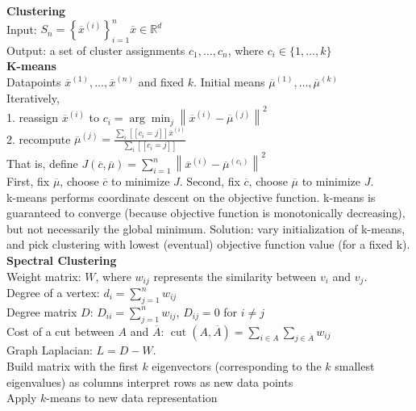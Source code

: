 \documentclass[10pt, letterpaper]{article}
\begin{document}
\begin{multicols*}{2}
\noindent
\textbf{Clustering}\\
Input: $S_{n}=\left\{\overline{x}^{(i)}\right\}_{i=1}^{n} \overline{x} \in \mathbb{R}^{d}$\\
Output: a set of cluster assignments $c_1,\dots,c_n$, where $c_{i} \in\{1, \ldots, k\}$\\
\textbf{K-means}\\
Datapoints $\overline{x}^{(1)}, \ldots, \overline{x}^{(n)}$ and fixed $k$. Initial means $\overline{\mu}^{(1)}, \ldots, \overline{\mu}^{(k)}$\\
Iteratively, \\
1. reassign $\overline{x}^{(i)}$ to $c_{i}=\arg \min _{j}\left\|\overline{x}^{(i)}-\overline{\mu}^{(j)}\right\|^{2}$\\
2. recompute $\overline{\mu}^{(j)}=\frac{\sum_{i}[[c_{i}=j]] \overline{x}^{(i)}}{\sum_{i}[[c_{i}=j]]}$\\
That is, define $J(\overline{c}, \overline{\mu})=\sum_{i=1}^{n}\left\|\overline{x}^{(i)}-\overline{\mu}^{\left(c_{i}\right)}\right\|^{2}$\\
First, fix $\overline \mu$, choose $\overline c$ to minimize $J$. Second, fix $\overline c$, choose $\overline \mu$ to minimize $J$.\\
k-means performs coordinate descent
on the objective function. k-means is guaranteed to converge (because objective function is monotonically decreasing), but not necessarily the global minimum. Solution: vary initialization of k-means, and pick clustering with lowest (eventual) objective function value (for a fixed k).\\
\textbf{Spectral Clustering}\\
Weight matrix: $W$, where $w_{ij}$ represents the similarity between $v_i$ and $v_j$.\\
Degree of a vertex: $d_{i}=\sum_{j=1}^{n} w_{i j}$\\
Degree matrix $D$: $D_{i i}=\sum_{j=1}^{n} w_{i j}$, $D_{i j}=0$ for $i \neq j$\\
Cost of a cut between $A$ and $\overline A$: $\operatorname{cut}(A, \overline{A})=\sum_{i \in A} \sum_{j \in \overline{A}} w_{i j}$\\
Graph Laplacian: $L = D - W$.\\
Build matrix with the first $k$ eigenvectors
(corresponding to the $k$ smallest eigenvalues)
as columns interpret rows as new data points\\
Apply $k$-means to new data representation\\

\end{multicols*}
\end{document}
